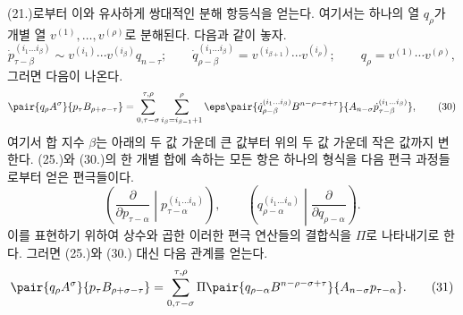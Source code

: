 
(21.)로부터 이와 유사하게 쌍대적인 분해 항등식을 얻는다. 여기서는 하나의 열 $q_\rho$가 개별 열 $v^{(1)},\ldots,v^{(\rho)}$로 분해된다. 다음과 같이 놓자.
\begin{equation}
 \dot p_{\tau-\beta}^{(i_1\ldots i_\beta)}\sim v^{(i_1)}\cdots v^{(i_\beta)}q_{n-\tau};\qquad
 \dot q_{\rho-\beta}^{(i_1\ldots i_\beta)}=v^{(i_{\beta+1})}\cdots v^{(i_\rho)};\qquad
 q_\rho=v^{(1)}\cdots v^{(\rho)},
\tag{29}
\end{equation}
그러면 다음이 나온다.
\begin{equation}
 \pair{q_\rho A^\sigma}{p_\tau B_{\rho+\sigma-\tau}}
 =\sum_{\substack{0,\tau-\sigma}}^{\substack{\tau,\rho}}
   \sum_{i_\beta=i_{\beta-1}+1}^{\rho}\eps
\pair{\dot q_{\rho-\beta}^{(i_1\ldots i_\beta)}B^{n-\rho-\sigma+\tau}}{A_{n-\sigma}\dot p_{\tau-\beta}^{(i_1\ldots i_\beta)}} ,
\tag{30}
\end{equation}
여기서 합 지수 $\beta$는 아래의 두 값 가운데 큰 값부터 위의 두 값 가운데 작은 값까지 변한다. (25.)와 (30.)의 한 개별 합에 속하는 모든 항은 하나의 형식을 다음 편극 과정들로부터 얻은 편극들이다.
\[
\left(\frac{\partial}{\partial p_{\tau-\alpha}}\middle|p_{\tau-\alpha}^{(i_1\ldots i_\alpha)}\right),\qquad
\left(q_{\rho-\alpha}^{(i_1\ldots i_\alpha)}\middle|\frac{\partial}{\partial q_{\rho-\alpha}}\right).
\]
이를 표현하기 위하여 상수와 곱한 이러한 편극 연산들의 결합식을 $\Pi$로 나타내기로 한다. 그러면 (25.)와 (30.) 대신 다음 관계를 얻는다.
\begin{equation}
 \pair{q_\rho A^\sigma}{p_\tau B_{\rho+\sigma-\tau}}
 =\sum_{\substack{0,\tau-\sigma}}^{\substack{\tau,\rho}}
 \Pi\pair{q_{\rho-\alpha}B^{n-\rho-\sigma+\tau}}{A_{n-\sigma}p_{\tau-\alpha}}.
\tag{31}
\end{equation}
